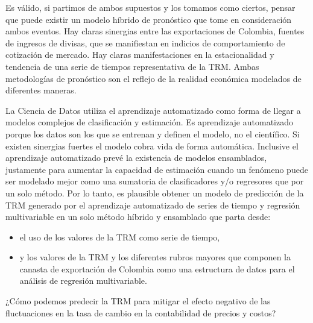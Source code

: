 \begin{spacing}{1.5}
Es válido, si partimos de ambos supuestos y los tomamos como ciertos, pensar que puede existir un modelo híbrido de pronóstico que tome en consideración ambos eventos. Hay claras sinergias entre las exportaciones de Colombia, fuentes de ingresos de divisas, que se manifiestan en indicios de comportamiento de cotización de mercado. Hay claras manifestaciones en la estacionalidad y tendencia de una serie de tiempos representativa de la TRM. Ambas metodologías de pronóstico son el reflejo de la realidad económica modelados de diferentes maneras.
 
La Ciencia de Datos utiliza el aprendizaje automatizado como forma de llegar a modelos complejos de clasificación y estimación. Es aprendizaje automatizado porque los datos son los que se entrenan y definen el modelo, no el científico. Si existen sinergias fuertes el modelo cobra vida de forma automática. Inclusive el aprendizaje automatizado prevé la existencia de modelos ensamblados, justamente para aumentar la capacidad de estimación cuando un fenómeno puede ser modelado mejor como una sumatoria de clasificadores y/o regresores que por un solo método. Por lo tanto, es plausible obtener un modelo de predicción de la TRM generado por el aprendizaje automatizado de series de tiempo y regresión multivariable en un solo método híbrido y ensamblado que parta desde:
 
\begin{itemize}
\item el uso de los valores de la TRM como serie de tiempo,
\item y los valores de la TRM y los diferentes rubros mayores que componen la canasta de exportación de Colombia como una estructura de datos para el análisis de regresión multivariable.
\end{itemize}

¿Cómo podemos predecir la TRM para mitigar el efecto negativo de las fluctuaciones en la tasa de cambio en la contabilidad de precios y costos?


\end{spacing}
